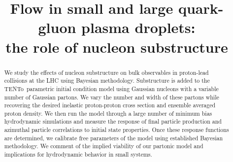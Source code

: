 \documentclass[3p,times,procedia]{elsarticle}
\newcommand{\trento}{T\raisebox{-0.3ex}{R}ENTo}
\begin{document}
\begin{frontmatter}




\title{Flow in small and large quark-gluon plasma droplets:\\the role of nucleon substructure}


\author{}

\address{}

\begin{abstract}
We study the effects of nucleon substructure on bulk observables in proton-lead collisions at the LHC using Bayesian methodology. Substructure is added to the \trento\ parametric initial condition model using Gaussian nucleons with a variable number of Gaussian partons. We vary the number and width of these partons while recovering the desired inelastic proton-proton cross section and ensemble averaged proton density. We then run the model through a large number of minimum bias hydrodynamic simulations and measure the response of final particle production and azimuthal particle correlations to initial state properties. Once these response functions are determined, we calibrate free parameters of the model using established Bayesian methodology. We comment of the implied viability of our partonic model and implications for hydrodynamic behavior in small systems.
\end{abstract}


\end{frontmatter}
\end{document}
